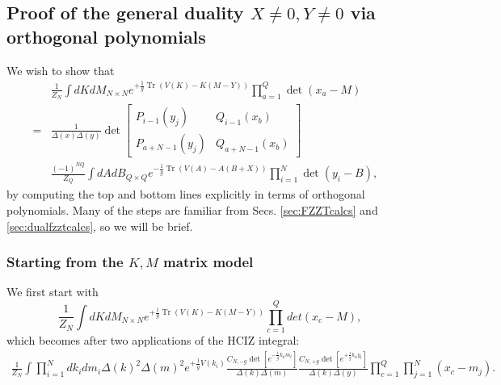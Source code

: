 \documentclass[english]{article}
\DeclareMathOperator{\Tr}{Tr}
\begin{document}
\subsection{Proof of the general duality $X \neq 0, Y \neq 0 $ via orthogonal polynomials}

We wish to show that
\begin{eqnarray} 
   & \frac{1}{Z_{N}} \int dK dM_{N \times N} e^{+ \frac{1}{g} \Tr \left(  V(K) - K(M-Y) \right)} \prod_{a=1}^{Q} \det(x_{a}-M) & \\
    = & \frac{1}{\Delta(x) \Delta(y)} \det \left[ \begin{array}{c|c} 
    P_{i-1}(y_{j}) & Q_{i-1}(x_{b}) \\ \hline
    P_{a+N-1}(y_{j}) & Q_{a+N-1}(x_{b}) 
    \end{array}\right] \\
     & \frac{(-1)^{NQ}}{Z_{Q}}\int dA dB_{Q \times Q} e^{- \frac{1}{g} \Tr \left( V(A) - A(B+X) \right)} \prod_{i=1}^{N} \det(y_{i}-B), &
\end{eqnarray}
by computing the top and bottom lines explicitly in terms of orthogonal polynomials. Many of the steps are familiar from Secs. \ref{sec:FZZTcalcs} and \ref{sec:dualfzztcalcs}, so we will be brief. 

\subsubsection{Starting from the $K,M$ matrix model}
 
We first start with 
\begin{equation}
   \frac{1}{Z_{N}}\int dK dM_{N \times N } e^{+\frac{1}{g} \Tr \left( V(K)-K(M-Y) \right) } \prod_{c=1}^{Q} det(x_{c}-M),
\end{equation}
which becomes after two applications of the HCIZ integral:
\begin{align}
    \frac{1}{Z_{N}}\int \prod_{i=1}^{N} dk_{i} dm_{i} \Delta(k)^2 \Delta(m)^2 e^{+\frac{1}{g}V(k_{i})} \frac{C_{N,-g}\det\left[ e^{-\frac{1}{g} k_{n}m_{l}} \right]}{\Delta(k)\Delta(m)} \frac{C_{N,+g}\det\left[ e^{+\frac{1}{g} k_{n}y_{l}} \right]}{\Delta(k)\Delta(y)} \prod_{c=1}^Q \prod_{j=1}^{N} (x_{c}-m_{j}).
\end{align}
\end{document}
